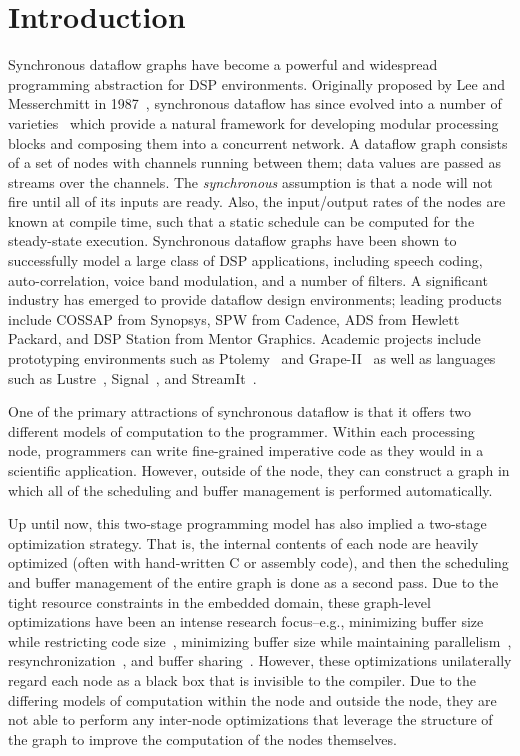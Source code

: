\section{Introduction}

Synchronous dataflow graphs have become a powerful and widespread
programming abstraction for DSP environments.  Originally proposed by
Lee and Messerchmitt in 1987~\cite{LM87-i}, synchronous dataflow has
since evolved into a number of
varieties~\cite{BELP96,Bhatt00,Murthy2002,Buck93} which provide a
natural framework for developing modular processing blocks and
composing them into a concurrent network.  A dataflow graph consists
of a set of nodes with channels running between them; data values are
passed as streams over the channels.  The {\it synchronous} assumption
is that a node will not fire until all of its inputs are ready.  Also,
the input/output rates of the nodes are known at compile time, such
that a static schedule can be computed for the steady-state execution.
Synchronous dataflow graphs have been shown to successfully model a
large class of DSP applications, including speech coding,
auto-correlation, voice band modulation, and a number of filters.  A
significant industry has emerged to provide dataflow design
environments; leading products include COSSAP from Synopsys, SPW from
Cadence, ADS from Hewlett Packard, and DSP Station from Mentor
Graphics.  Academic projects include prototyping environments such as
Ptolemy~\cite{Lee01} and Grape-II~\cite{Lauw95} as well as languages
such as Lustre~\cite{lustre}, Signal~\cite{Gaut87}, and
StreamIt~\cite{Gordo02}.

One of the primary attractions of synchronous dataflow is that it
offers two different models of computation to the programmer.  Within
each processing node, programmers can write fine-grained imperative
code as they would in a scientific application.  However, outside of
the node, they can construct a graph in which all of the scheduling
and buffer management is performed automatically.

Up until now, this two-stage programming model has also implied a
two-stage optimization strategy.  That is, the internal contents of
each node are heavily optimized (often with hand-written C or assembly
code), and then the scheduling and buffer management of the entire
graph is done as a second pass.  Due to the tight resource constraints
in the embedded domain, these graph-level optimizations have been an
intense research focus--e.g., minimizing buffer size while restricting
code size~\cite{murt1997x1}, minimizing buffer size while maintaining
parallelism~\cite{GGD94}, resynchronization~\cite{Bhatta2000}, and
buffer sharing~\cite{murt2001x1}.  However, these optimizations
unilaterally regard each node as a black box that is invisible to the
compiler.  Due to the differing models of computation within the node
and outside the node, they are not able to perform any inter-node
optimizations that leverage the structure of the graph to improve the
computation of the nodes themselves.

